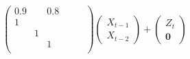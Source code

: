 \documentclass[cn]{homework}
\begin{document}
\begin{subproblem}[(\alph*)]
\[\begin{pmatrix}
            0.9 &     & 0.8 &      &     &     \\
            1   &     &     &      &     &     \\
                & 1   &     &      &     &     \\
                &     & 1   &      &     &     \\
        \end{pmatrix}
        \begin{pmatrix}
            X_{t-1}\\
            X_{t-2}
        \end{pmatrix}
        +\begin{pmatrix}
            Z_t\\
            \boldsymbol 0
        \end{pmatrix}\]
    \end{subproblem}
\end{document}
